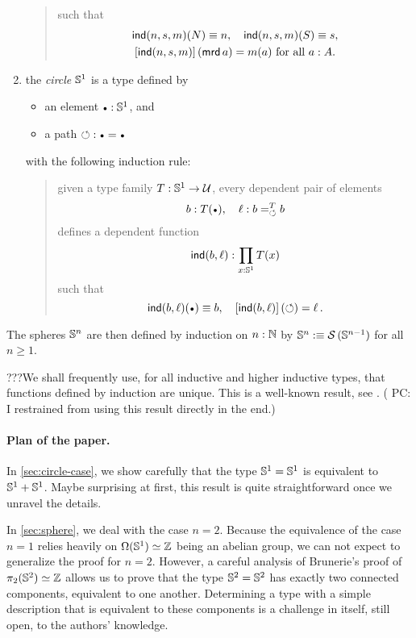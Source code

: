 \documentclass[english,a4]{article}
\renewcommand{\ap}[1]{\left[{#1}\right]}
\begin{document}
\begin{enumerate}
\begin{quote}
\begin{displaymath}
    \end{displaymath}
    such that
    \begin{gather*}
      \ind(n,s,m)(N) \jdeq n,\quad \ind(n,s,m)(S) \jdeq s,\\
      \ap{\ind(n,s,m)}(\mrd a) = m(a)\ \text{for all}\ a\from A.
    \end{gather*}
  \end{quote}
\item the {\em circle} ${{\mathbb S^{1}}}$ is a type defined by
  \begin{itemize}
  \item an element $\base \from \Sc$, and
  \item a path $\Sloop: \base = \base$
  \end{itemize}
  with the following induction rule:
  \begin{quote}
    given a type family $T: {{\mathbb S^{1}}} \to \mathcal{U}$, every dependent pair of
    elements
    \begin{displaymath}
      b\from T(\base), \quad \ell\from \pathover b T \Sloop b
    \end{displaymath}
    defines a dependent function
    \begin{displaymath}
      \operatorname{\mathsf{ind}}(b,\ell):\prod_{x: {{\mathbb S^{1}}}} T(x)
    \end{displaymath}
    such that
    \begin{displaymath}
      \ind(b,\ell)(\base) \jdeq b,\quad \ap{\ind(b,\ell)}(\Sloop) = \ell \,.
    \end{displaymath}
  \end{quote}
\end{enumerate}
The spheres ${\mathbb S^{n}}$ are then defined by induction on $n:\mathbb{N}$ by
${\mathbb S^{n}} \mathrel{\hbox{:}\mkern-5mu\equiv} \operatorname{\mathcal S} {({\mathbb S^{n-1}})}$ for all $n\geq 1$.

???We shall frequently use, for all inductive and higher inductive types,
that functions defined by induction are unique. This is a well-known
result, see \cite{XXX}. ({\color{red} PC: I restrained from using this result directly in the end.})

\paragraph{Plan of the paper.}%
In \cref{sec:circle-case}, we show carefully that the type ${{\mathbb S^{1}}} = {{\mathbb S^{1}}}$
is equivalent to ${{\mathbb S^{1}}} + {{\mathbb S^{1}}}$. Maybe surprising at first, this result
is quite straightforward once we unravel the details.

In \cref{sec:sphere}, we deal with the case $n=2$. Because the
equivalence of the case $n=1$ relies heavily on $\Omega({{\mathbb S^{1}}})\simeq \mathbb{Z}$
being an abelian group, we can not expect to generalize the proof for
$n=2$. However, a careful analysis of Brunerie's proof of
$\pi_2({{\mathbb S^{2}}}) \simeq \mathbb{Z}$ allows us to prove that the type ${{\mathbb S^{2}}}={{\mathbb S^{2}}}$ has
exactly two connected components, equivalent to one another. 
Determining a type with a simple description that is
equivalent to these components is a challenge in itself, still open,
to the authors' knowledge.
\end{document}
